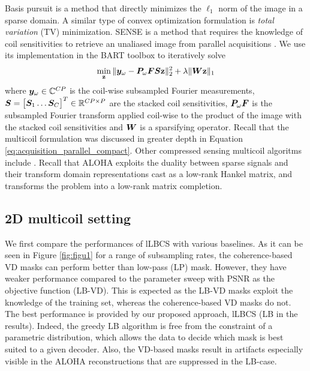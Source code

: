 Basis pursuit is a method that directly minimizes the $\ell_1$ norm of the image in a sparse domain. A similar type of convex optimization formulation is {\em total variation} (TV) minimization. 
SENSE is a method that requires the knowledge of coil sensitivities to retrieve an unaliased image from parallel acquisitions \citep{pruessmann1999sense}. We use its implementation in the BART toolbox \citep{uecker2015berkeley} to iteratively solve %
\begin{equation}
\min_{\mathbf{z}} \|{\bm{y}}_\omega - {\bm{P}}_\omega {\bm{F}} {\bm{S}} \mathbf{z}\|_2^2 + \lambda \|{\bm{W}}\mathbf{z}\|_1 \label{eq:opti}
\end{equation}
where ${\bm{y}}_\omega \in \mathbb{C}^{CP}$ is the coil-wise subsampled Fourier measurements, ${\bm{S}} =  \begin{bmatrix} {\bm{S}}_1 \ldots {\bm{S}}_C \end{bmatrix}^T \in \mathbb{R}^{CP\times P}$ are the stacked coil sensitivities,  ${\bm{P}}_\omega {\bm{F}}$ is the subsampled Fourier transform applied coil-wise to the product of the image with the stacked coil sensitivities and ${\bm{W}}$ is a sparsifying operator. Recall that the multicoil formulation was discussed in greater depth in Equation \ref{eq:acquisition_parallel_compact}. 
Other compressed sensing multicoil algoritms include \citep{uecker2014espirit,chaari2011wavelet}. Recall that ALOHA exploits the duality between sparse signals and their transform domain representations cast as a low-rank Hankel matrix, and transforms the problem into a low-rank matrix completion.

\subsection{2D multicoil setting}
We first compare the performances of lLBCS with various baselines.  As it can be seen in Figure \ref{fig:figu1} for a range of subsampling rates, the coherence-based VD masks can perform better than low-pass (LP) mask. However, they have weaker performance compared to the parameter sweep with PSNR as the objective function (LB-VD). This is expected as the LB-VD masks exploit the knowledge of the training set, whereas the coherence-based VD masks do not. The best performance is provided by our proposed approach, lLBCS (LB in the results). Indeed, the greedy LB algorithm is free from the constraint of a parametric distribution, which allows the data to decide which mask is best suited to a given decoder. Also, the VD-based masks result in artifacts especially visible in the ALOHA reconstructions that are suppressed in the LB-case.


